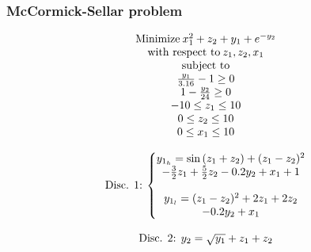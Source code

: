 \documentclass[conf]{new-aiaa}
\begin{document}
\subsubsection{McCormick-Sellar problem}
\begin{equation}
    \begin{matrix}
    \textnormal{Minimize} \: x_1^2+z_2+y_1+e^{-y_2} \\
    \textnormal{with respect to} \: z_1,z_2,x_1 \\
    \textnormal{subject to}  \\
    \frac{y_1}{3.16}-1\geq 0  \\
    1-\frac{y_2}{24}\geq 0 \\
    -10\leq z_1 \leq 10 \\
    0\leq z_2 \leq 10 \\
    0\leq x_1 \leq 10 \\
    \\
    \textnormal{Disc. 1:} \: \left\{\begin{matrix} 
     y_{1_h}=\sin{(z_1+z_2)}+(z_1-z_2)^2\\-\frac{3}{2}z_1+\frac{5}{2}z_2-0.2y_2+x_1+1 \\
    \\
    y_{1_l}=(z_1-z_2)^2+2z_1+2z_2\\-0.2y_2+x_1
    \end{matrix} \right. \\
    \\
    \textnormal{Disc. 2:} \:\: y_2=\sqrt{y_1}+z_1+z_2\\
    \end{matrix}
\end{equation}
\end{document}
